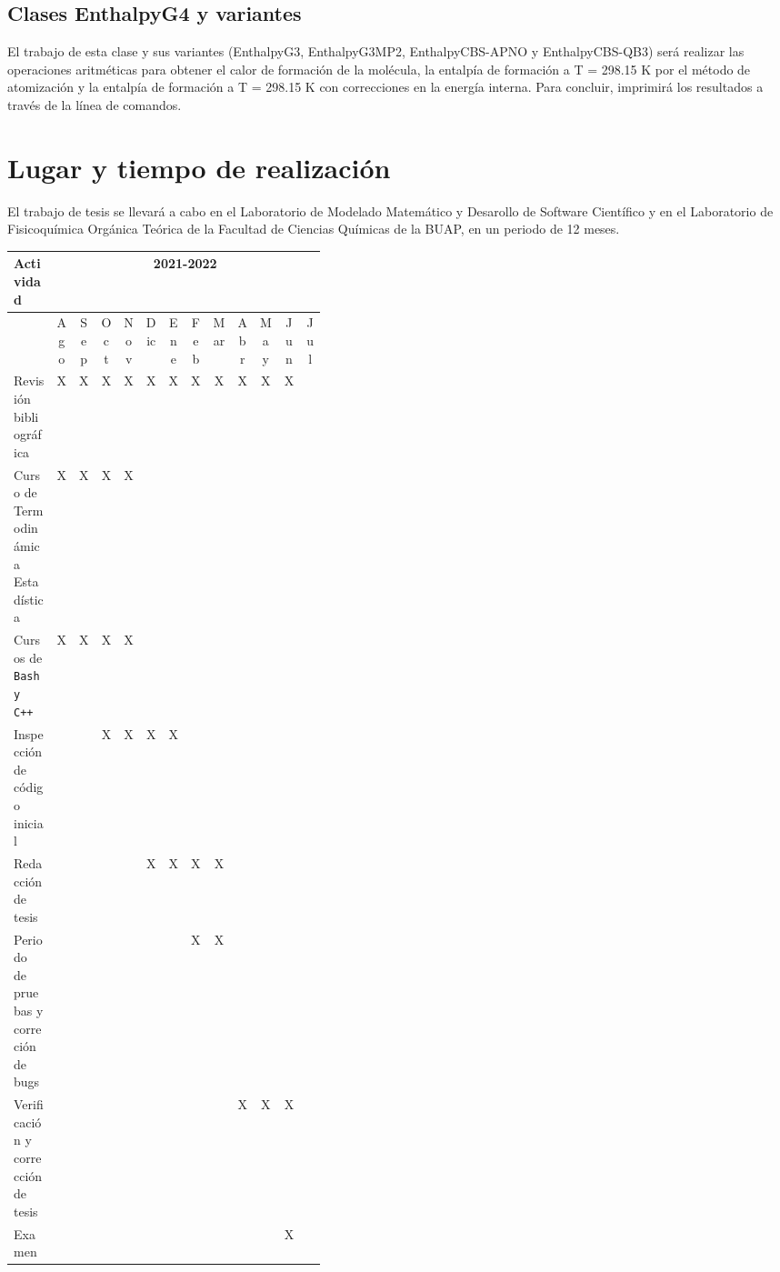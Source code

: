 \documentclass[12pt]{article}
\begin{document}
\subsection*{Clases EnthalpyG4 y variantes}
El trabajo de esta clase y sus variantes (EnthalpyG3, EnthalpyG3MP2, EnthalpyCBS-APNO y EnthalpyCBS-QB3) será realizar las operaciones aritméticas para obtener el calor de formación de la molécula, la entalpía de formación a T = 298.15 K por el método de atomización y la entalpía de formación a T = 298.15 K con correcciones en la energía interna. Para concluir, imprimirá los resultados a través de la línea de comandos.

\section*{Lugar y tiempo de realización}
El trabajo de tesis se llevará a cabo en el Laboratorio de Modelado Matemático y Desarollo de Software Científico y en el Laboratorio de Fisicoquímica Orgánica Teórica de la Facultad de Ciencias Químicas de la BUAP, en un periodo de 12 meses.
\vspace{1cm}
\begin{table}[hbp!]
\centering
\footnotesize
\setlength{\tabcolsep}{2.0pt}
\begin{tabular}{||p{0.4\linewidth}|c|c|c|c|c|c|c|c|c|c|c|c||}
\hline
\textbf{Actividad} & \multicolumn{12}{|c||}{2021-2022}\\\hline
& Ago & Sep & Oct & Nov & Dic & Ene & Feb & Mar & Abr & May & Jun & Jul\\\hline
Revisión bibliográfica & X & X & X & X & X & X & X & X & X & X & X &  \\\hline
Curso de Termodinámica Estadística & X & X & X & X & & & & & & & &  \\\hline
Cursos de \texttt{Bash y C++} & X & X & X & X & & & & & & & &  \\\hline
Inspección de código inicial & & & X & X & X & X & & & & & & \\\hline
Redacción de tesis &  &  &  &  & X & X & X & X & & & & \\\hline
Periodo de pruebas y correción de bugs & & & & & & & X & X & & & & \\\hline
Verificación y corrección de tesis & & & & & & & & & X & X & X & \\\hline
Examen &  &  &  &  &  &  &  &  &  &  & X  & \\\hline
\end{tabular}
\end{table}
\newpage
 

\end{document}
